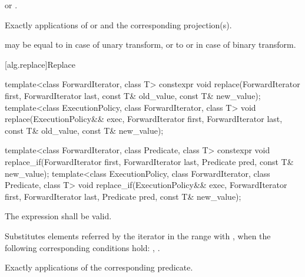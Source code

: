 \begin{addedblock}
\begin{itemdescr}
\pnum
\returns
{}
 or .

\pnum
\complexity
Exactly
applications of
 or  and the corresponding projection(s).

\pnum
\remarks
{} may be equal to 
in case of unary transform,
or to  or 
in case of binary transform.
\end{itemdescr}
\end{addedblock}

[alg.replace]{Replace}

%
%
\begin{itemdecl}
template<class ForwardIterator, class T>
  constexpr void replace(ForwardIterator first, ForwardIterator last,
                         const T& old_value, const T& new_value);
template<class ExecutionPolicy, class ForwardIterator, class T>
  void replace(ExecutionPolicy&& exec,
               ForwardIterator first, ForwardIterator last,
               const T& old_value, const T& new_value);

template<class ForwardIterator, class Predicate, class T>
  constexpr void replace_if(ForwardIterator first, ForwardIterator last,
                            Predicate pred, const T& new_value);
template<class ExecutionPolicy, class ForwardIterator, class Predicate, class T>
  void replace_if(ExecutionPolicy&& exec,
                  ForwardIterator first, ForwardIterator last,
                  Predicate pred, const T& new_value);
\end{itemdecl}

\begin{itemdescr}
\pnum
\requires
The expression
shall be valid.

\pnum
\effects
Substitutes elements referred by the iterator
in the range 
with ,
when the following corresponding conditions hold:
, .

\pnum
\complexity
Exactly
applications of the corresponding predicate.
\end{itemdescr}

